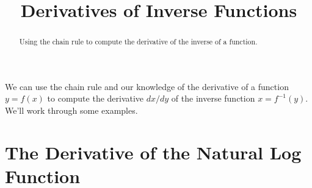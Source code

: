 \documentclass{ximera}
\title{Derivatives of Inverse Functions}
\begin{document}
\begin{abstract}
Using the chain rule to compute the derivative of the inverse of a function.
\end{abstract}
\maketitle

We can use the chain rule and our knowledge of the derivative of a function $y=f(x)$ to compute the derivative $dx/dy$ of the inverse function $x = f^{-1}(y)$. We'll work through some examples.

\section*{The Derivative of the Natural Log Function}
\end{document}
